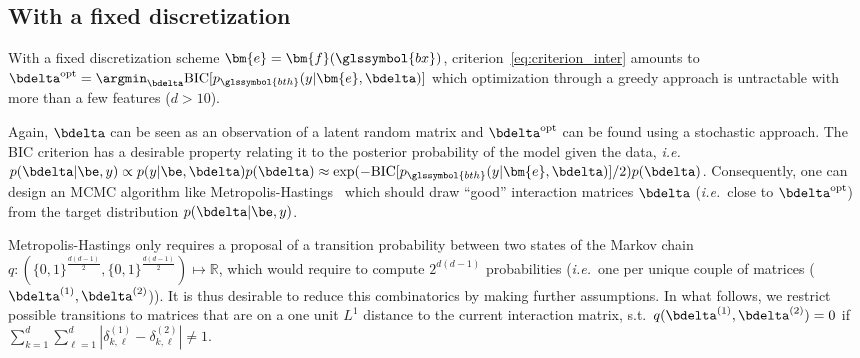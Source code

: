 \subsection{With a fixed discretization}

With a fixed discretization scheme $\bm{e} = \bm{f}(\glssymbol{bx})$, criterion~\ref{eq:criterion_inter} amounts to $\bdelta^{\text{opt}} = \argmin_{\bdelta} \text{BIC}[p_{\glssymbol{bth}}(y|\bm{e},\bdelta)]$ which optimization through a greedy approach is untractable with more than a few features ($d > 10$).

Again, $\bdelta$ can be seen as an observation of a latent random matrix and $\bdelta^{\text{opt}}$ can be found using a stochastic approach. The BIC criterion has a desirable property relating it to the posterior probability of the model given the data, \textit{i.e.}\ $p(\bdelta | \be, y) \propto p(y | \be, \bdelta) p(\bdelta) \approx \exp(-\text{BIC}[p_{\glssymbol{bth}}(y|\bm{e},\bdelta)]/2)  p(\bdelta)$. Consequently, one can design an MCMC algorithm like Metropolis-Hastings~\cite{hastings1970monte} which should draw ``good'' interaction matrices $\bdelta$ (\textit{i.e.}\ close to $\bdelta^{\text{opt}}$) from the target distribution $p(\bdelta | \be, y)$.

Metropolis-Hastings only requires a proposal of a transition probability between two states of the Markov chain $q: ({\{0,1\}}^{\frac{d(d-1)}{2}},{\{0,1\}}^{\frac{d(d-1)}{2}}) \mapsto \mathbb{R}$, which would require to compute $2^{d(d-1)}$ probabilities (\textit{i.e.}\ one per unique couple of matrices ($\bdelta^{(1)},\bdelta^{(2)}$)). It is thus desirable to reduce this combinatorics by making further assumptions. In what follows, we restrict possible transitions to matrices that are on a one unit $L^1$ distance to the current interaction matrix, s.t.\ $q(\bdelta^{(1)},\bdelta^{(2)}) = 0$ if $\sum_{k=1}^d \sum_{\ell=1}^d |\delta^{(1)}_{k,\ell} - \delta^{(2)}_{k,\ell}| \neq 1$.

